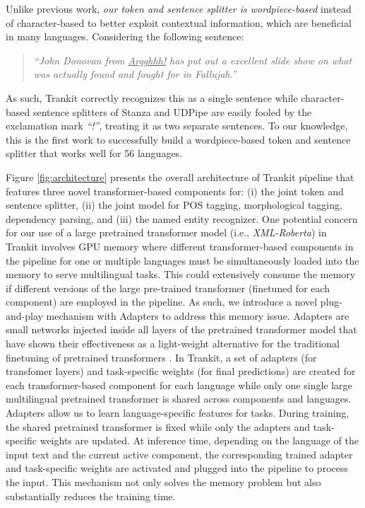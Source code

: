 \documentclass[11pt,a4paper]{article}
\begin{document}
Unlike previous work, {\it our token and sentence splitter is wordpiece-based} instead of character-based to better exploit contextual information, which are beneficial in many languages. Considering the following sentence:



\begin{quote}
    \small \textit{``John Donovan from \underline{Argghhh!} has put out a excellent slide show on what was actually found and fought for in Fallujah.''}
\end{quote}
As such, Trankit correctly recognizes this as a single sentence while character-based sentence splitters of Stanza and UDPipe are easily fooled by the exclamation mark \textit{``!''}, treating it as two separate sentences. To our knowledge, this is the first work to successfully build a wordpiece-based token and sentence splitter that works well for 56 languages.



Figure \ref{fig:architecture} presents the overall architecture of Trankit pipeline that features three novel transformer-based components for: (i) the joint token and sentence splitter, (ii) the joint model for POS tagging, morphological tagging, dependency parsing, and (iii) the named entity recognizer. One potential concern for our use of a large pretrained transformer model (i.e., {\it XML-Roberta}) in Trankit involves GPU memory where different transformer-based components in the pipeline for one or multiple languages must be simultaneously loaded into the memory to serve multilingual tasks. This could extensively consume the memory if different versions of the large pre-trained transformer (finetuned for each component) are employed in the pipeline. As such, we introduce a novel plug-and-play mechanism with Adapters to address this memory issue. Adapters are small networks injected inside all layers of the pretrained transformer model that have shown their effectiveness as a light-weight alternative for the traditional finetuning of pretrained transformers \citep{houlsby2019parameter,peters-etal-2019-tune,pfeiffer-etal-2020-adapterhub,pfeiffer-etal-2020-mad}. In Trankit, a set of adapters (for transfomer layers) and task-specific weights (for final predictions) are created for each transformer-based component for each language while only one single large multilingual pretrained transformer is shared across components and languages. Adapters allow us to learn language-specific features for tasks. During training, the shared pretrained transformer is fixed while only the adapters and task-specific weights are updated. At inference time, depending on the language of the input text and the current active component, the corresponding trained adapter and task-specific weights are activated and plugged into the pipeline to process the input. This mechanism not only solves the memory problem but also substantially reduces the training time.
\end{document}
